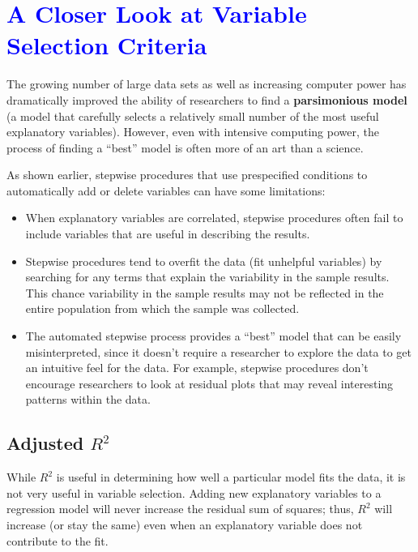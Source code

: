 \documentclass[
]{report}
\begin{document}
\hypertarget{section-37}{%
\section{\texorpdfstring{\textcolor{blue}{A Closer Look at Variable Selection Criteria}}{}}\label{section-37}}

The growing number of large data sets as well as increasing computer power has dramatically improved the ability of researchers to find a \textbf{parsimonious model} (a model that carefully selects a relatively small number of the most useful explanatory variables). However, even with intensive computing power, the process of finding a ``best'' model is often more of an art than a science.

As shown earlier, stepwise procedures that use prespecified conditions to automatically add or delete variables can have some limitations:

\begin{itemize}
\item
  When explanatory variables are correlated, stepwise procedures often fail to include variables that are useful in describing the results.
\item
  Stepwise procedures tend to overfit the data (fit unhelpful variables) by searching for any terms that explain the variability in the sample results. This chance variability in the sample results may not be reflected in the entire population from which the sample was collected.
\item
  The automated stepwise process provides a ``best'' model that can be easily misinterpreted, since it doesn't require a researcher to explore the data to get an intuitive feel for the data. For example, stepwise procedures don't encourage researchers to look at residual plots that may reveal interesting patterns within the data.
\end{itemize}

\hypertarget{adjusted-scriptstyle-r2}{%
\subsection*{\texorpdfstring{Adjusted \(\scriptstyle {R}^2\)}{Adjusted \textbackslash scriptstyle \{R\}\^{}2}}\label{adjusted-scriptstyle-r2}}

While \(\scriptstyle {R}^2\) is useful in determining how well a particular model fits the data, it is not very useful in variable selection. Adding new explanatory variables to a regression model will never increase the residual sum of squares; thus, \(\scriptstyle {R}^2\) will increase (or stay the same) even when an explanatory variable does not contribute to the fit.
\end{document}
